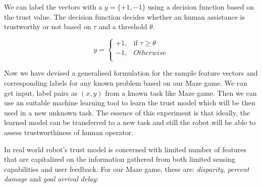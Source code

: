 \documentclass{sig-alternate}
\begin{document}
We can label the vectors with a $y = \{+1, -1\}$ using a decision function based on the trust value. The decision function decides whether an human assistance is trustworthy or not based on $\tau$ and a threshold $\theta$.

\[
y = 
\begin{cases}
+1, & \text{if } \tau\ge \theta\\
-1, & Otherwise\\
\end{cases}
\]

Now we have devised a generalised formulation for the sample feature vectors and corresponding labels for any known problem based on our Maze game. We can get input, label pairs as $(x, y)$ from a known task like Maze game. Then we can use an suitable machine learning tool to learn the trust model which will be then used in a new unknown  task. The essence of this experiment is that ideally, the learned model can be transferred to a new task and still the robot will be able to assess trustworthiness of human operator.
  
 In real world robot's trust model is concerned with limited number of features that are capitalized on the information gathered from both limited sensing capabilities and user feedback. For our Maze game,
these are: \textit{disparity}, \textit{percent damage} and \textit{goal arrival
  delay}:
\end{document}
